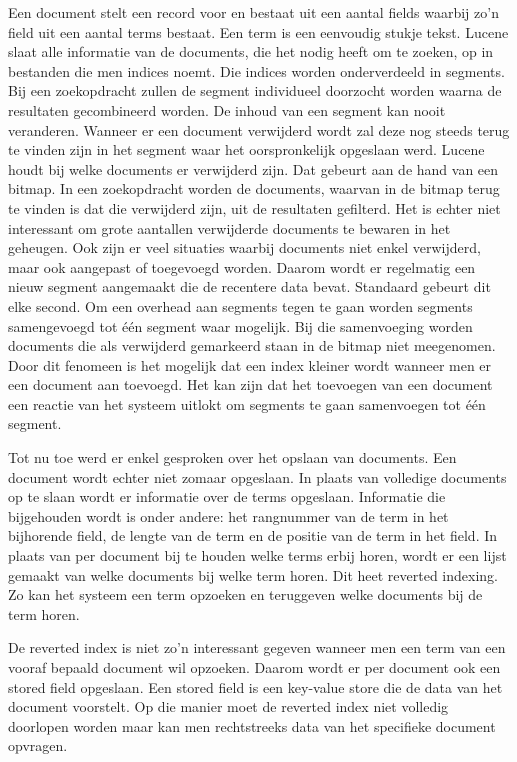Een document stelt een record voor en bestaat uit een aantal fields waarbij zo’n field uit een aantal terms bestaat. Een term is een eenvoudig stukje tekst. Lucene slaat alle informatie van de documents, die het nodig heeft om te zoeken, op in bestanden die men indices noemt. Die indices worden onderverdeeld in segments. Bij een zoekopdracht zullen de segment individueel doorzocht worden waarna de resultaten gecombineerd worden. De inhoud van een segment kan nooit veranderen. Wanneer er een document verwijderd wordt zal deze nog steeds terug te vinden zijn in het segment waar het oorspronkelijk opgeslaan werd. Lucene houdt bij welke documents er verwijderd zijn. Dat gebeurt aan de hand van een bitmap. In een zoekopdracht worden de documents, waarvan in de bitmap terug te vinden is dat die verwijderd zijn, uit de resultaten gefilterd. Het is echter niet interessant om grote aantallen verwijderde documents te bewaren in het geheugen. Ook zijn er veel situaties waarbij documents niet enkel verwijderd, maar ook aangepast of toegevoegd worden. Daarom wordt er regelmatig een nieuw segment aangemaakt die de recentere data bevat. Standaard gebeurt dit elke second. Om een overhead aan segments tegen te gaan worden segments samengevoegd tot één segment waar mogelijk. Bij die samenvoeging worden documents die als verwijderd gemarkeerd staan in de bitmap niet meegenomen. Door dit fenomeen is het mogelijk dat een index kleiner wordt wanneer men er een document aan toevoegd. Het kan zijn dat het toevoegen van een document een reactie van het systeem uitlokt om segments te gaan samenvoegen tot één segment. \autocite{Brasetvik2017}

Tot nu toe werd er enkel gesproken over het opslaan van documents. Een document wordt echter niet zomaar opgeslaan. In plaats van volledige documents op te slaan wordt er informatie over de terms opgeslaan. Informatie die bijgehouden wordt is onder andere: het rangnummer van de term in het bijhorende field, de lengte van de term en de positie van de term in het field. In plaats van per document bij te houden welke terms erbij horen, wordt er een lijst gemaakt van welke documents bij welke term horen. Dit heet reverted indexing. Zo kan het systeem een term opzoeken en teruggeven welke documents bij de term horen. \autocite{Whissel2009}

De reverted index is niet zo'n interessant gegeven wanneer men een term van een vooraf bepaald document wil opzoeken. Daarom wordt er per document ook een stored field opgeslaan. Een stored field is een key-value store die de data van het document voorstelt. Op die manier moet de reverted index niet volledig doorlopen worden maar kan men rechtstreeks data van het specifieke document opvragen.

